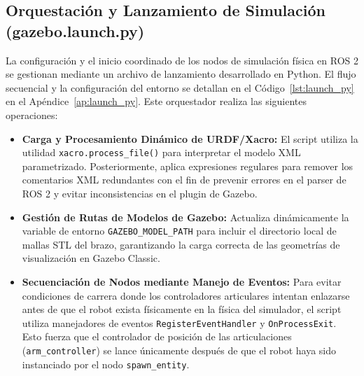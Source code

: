 \documentclass[conference,a4paper]{IEEEtran}
\begin{document}
\subsection{Orquestación y Lanzamiento de Simulación (gazebo.launch.py)}
La configuración y el inicio coordinado de los nodos de simulación física en ROS 2 se gestionan mediante un archivo de lanzamiento desarrollado en Python. El flujo secuencial y la configuración del entorno se detallan en el Código~\ref{lst:launch_py} en el Apéndice~\ref{ap:launch_py}.
Este orquestador realiza las siguientes operaciones:
\begin{itemize}
    \item \textbf{Carga y Procesamiento Dinámico de URDF/Xacro:} El script utiliza la utilidad \texttt{xacro.process\_file()} para interpretar el modelo XML parametrizado. Posteriormente, aplica expresiones regulares para remover los comentarios XML redundantes con el fin de prevenir errores en el parser de ROS 2 y evitar inconsistencias en el plugin de Gazebo.
    \item \textbf{Gestión de Rutas de Modelos de Gazebo:} Actualiza dinámicamente la variable de entorno \texttt{GAZEBO\_MODEL\_PATH} para incluir el directorio local de mallas STL del brazo, garantizando la carga correcta de las geometrías de visualización en Gazebo Classic.
    \item \textbf{Secuenciación de Nodos mediante Manejo de Eventos:} Para evitar condiciones de carrera donde los controladores articulares intentan enlazarse antes de que el robot exista físicamente en la física del simulador, el script utiliza manejadores de eventos \texttt{RegisterEventHandler} y \texttt{OnProcessExit}. Esto fuerza que el controlador de posición de las articulaciones (\texttt{arm\_controller}) se lance únicamente después de que el robot haya sido instanciado por el nodo \texttt{spawn\_entity}.
\end{itemize}
\end{document}
